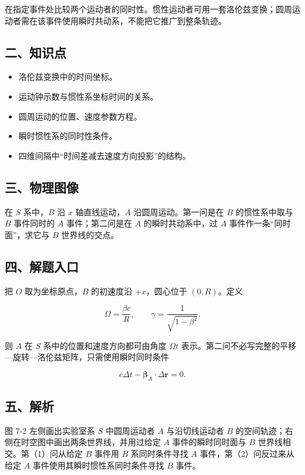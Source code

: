 \documentclass[12pt,a4paper,UTF8]{ctexart}
\newcommand{\tightlist}{\setlength{\itemsep}{0pt}\setlength{\parskip}{0pt}}
\begin{document}
在指定事件处比较两个运动者的同时性。惯性运动者可用一套洛伦兹变换；圆周运动者需在该事件使用瞬时共动系，不能把它推广到整条轨迹。

\subsection{二、知识点}\label{ux4e8cux77e5ux8bc6ux70b9-6}

\begin{itemize}
\tightlist
\item
  洛伦兹变换中的时间坐标。
\item
  运动钟示数与惯性系坐标时间的关系。
\item
  圆周运动的位置、速度参数方程。
\item
  瞬时惯性系的同时性条件。
\item
  四维间隔中``时间差减去速度方向投影''的结构。
\end{itemize}

\subsection{三、物理图像}\label{ux4e09ux7269ux7406ux56feux50cf-6}

在 \(S\) 系中，\(B\) 沿 \(x\) 轴直线运动，\(A\) 沿圆周运动。第一问是在
\(B\) 的惯性系中取与 \(B\) 事件同时的 \(A\) 事件；第二问是在 \(A\)
的瞬时共动系中，过 \(A\) 事件作一条``同时面''，求它与 \(B\)
世界线的交点。

\subsection{四、解题入口}\label{ux56dbux89e3ux9898ux5165ux53e3-6}

把 \(O\) 取为坐标原点，\(B\) 的初速度沿 \(+x\)，圆心位于 \((0,R)\)。定义

\[\Omega=\frac{\beta c}{R},\qquad \gamma=\frac1{\sqrt{1-\beta^2}}.\]

则 \(A\) 在 \(S\) 系中的位置和速度方向都可由角度 \(\Omega t\)
表示。第二问不必写完整的平移---旋转---洛伦兹矩阵，只需使用瞬时同时条件

\[c\Delta t-\boldsymbol\beta_A\cdot\Delta\boldsymbol r=0.\]

\subsection{五、解析}\label{ux4e94ux89e3ux6790-6}

图 7-2 左侧画出实验室系 \(S\) 中圆周运动者 \(A\) 与沿切线运动者 \(B\)
的空间轨迹；右侧在时空图中画出两条世界线，并用过给定 \(A\)
事件的瞬时同时面与 \(B\) 世界线相交。第（1）问从给定 \(B\) 事件用 \(B\)
系同时条件寻找 \(A\) 事件，第（2）问反过来从给定 \(A\)
事件使用其瞬时惯性系同时条件寻找 \(B\) 事件。
\end{document}
